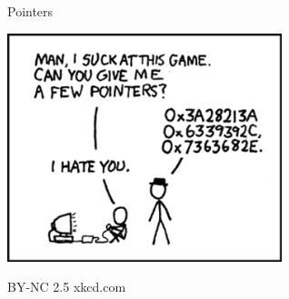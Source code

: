 \documentclass[a6paper,fontsize=10pt,twoside,open=right]{scrbook}
\begin{document}
\newpage

\vspace{15pt}

\newpage

\newpage

\newpage

\vspace{15pt}

\newpage

\newpage

\vspace*{-10pt}
\newpage

\vspace{15pt}

\newpage

\newpage

\newpage

\newpage

\newpage

\newpage

\newpage

\newpage

\newpage

\newpage

\newpage

\vspace*{-14pt}
\newpage

\newpage

\newpage

\newpage

\vspace{15pt}

\newpage

\newpage

\vspace{15pt}

\newpage

\newpage

\newpage

\vspace{15pt}
\vfill
{}
\begin{center}
  \tiny{Pointers}\par
  \vspace{5pt}
  \includegraphics[keepaspectratio,width=0.6\textwidth]{elements/images/pointers.png}\par
  \vspace{5pt}
  \tiny{BY-NC 2.5 xkcd.com}
\end{center}
\end{document}
